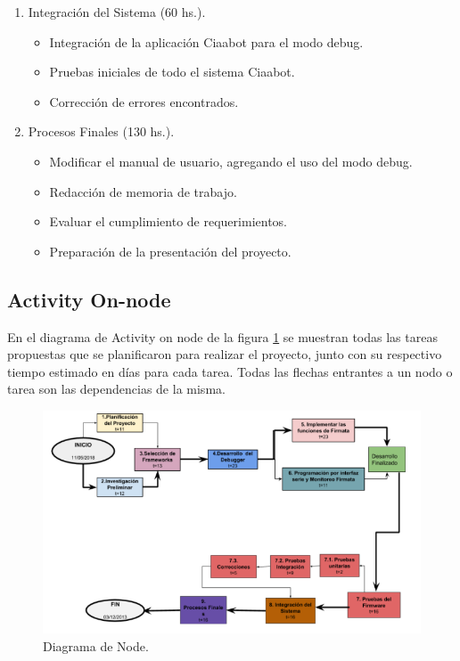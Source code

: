 \begin{enumerate}
	\item Integración del Sistema (60 hs.).
	
	\begin{itemize}
		\item Integración de la aplicación Ciaabot para el modo debug.
		\item Pruebas iniciales de todo el sistema Ciaabot.
		\item Corrección de errores encontrados.
	\end{itemize}

	\item Procesos Finales (130 hs.).
	
	\begin{itemize}
		\item Modificar el manual de usuario, agregando el uso del modo debug.
		\item Redacción de memoria de trabajo.
		\item Evaluar el cumplimiento de requerimientos.
		\item Preparación de la presentación del proyecto.
	\end{itemize}

\end{enumerate}

\subsection{Activity On-node} 

En el diagrama de Activity on node de la figura  \ref{fig:diagramaNode} se muestran todas las tareas propuestas que se planificaron para realizar el proyecto, junto con su respectivo tiempo estimado en días para cada tarea.
Todas las flechas entrantes a un nodo o tarea son las dependencias de la misma.
 

\begin{figure}[h]
	\centering
	\includegraphics[scale=.80]{./Figures/diagramaNode.png}
	\caption{Diagrama de Node.}
	\label{fig:diagramaNode}
\end{figure}

